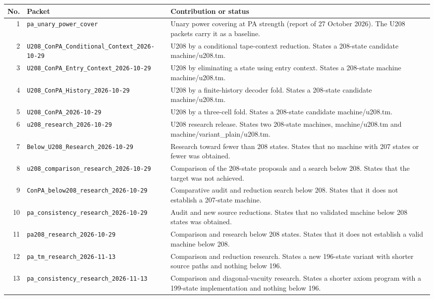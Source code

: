 {\small
\begin{longtable}{rp{}p{}}
\toprule No. & Packet & Contribution or status\\\midrule\endhead
1&\nolinkurl{pa_unary_power_cover}&Unary power covering at PA strength (report of 27 October 2026). The U208 packets carry it as a baseline.\\[3pt]
2&\nolinkurl{U208_ConPA_Conditional_Context_2026-10-29}&U208 by a conditional tape-context reduction. States a 208-state candidate machine/u208.tm.\\[3pt]
3&\nolinkurl{U208_ConPA_Entry_Context_2026-10-29}&U208 by eliminating a state using entry context. States a 208-state machine machine/u208.tm.\\[3pt]
4&\nolinkurl{U208_ConPA_History_2026-10-29}&U208 by a finite-history decoder fold. States a 208-state candidate machine/u208.tm.\\[3pt]
5&\nolinkurl{U208_ConPA_2026-10-29}&U208 by a three-cell fold. States a 208-state candidate machine/u208.tm.\\[3pt]
6&\nolinkurl{u208_research_2026-10-29}&U208 research release. States two 208-state machines, machine/u208.tm and machine/variant\_plain/u208.tm.\\[3pt]
7&\nolinkurl{Below_U208_Research_2026-10-29}&Research toward fewer than 208 states. States that no machine with 207 states or fewer was obtained.\\[3pt]
8&\nolinkurl{u208_comparison_research_2026-10-29}&Comparison of the 208-state proposals and a search below 208. States that the target was not achieved.\\[3pt]
9&\nolinkurl{ConPA_below208_research_2026-10-29}&Comparative audit and reduction search below 208. States that it does not establish a 207-state machine.\\[3pt]
10&\nolinkurl{pa_consistency_research_2026-10-29}&Audit and new source reductions. States that no validated machine below 208 states was obtained.\\[3pt]
11&\nolinkurl{pa208_research_2026-10-29}&Comparison and research below 208 states. States that it does not establish a valid machine below 208.\\[3pt]
12&\nolinkurl{pa_tm_research_2026-11-13}&Comparison and reduction research. States a new 196-state variant with shorter source paths and nothing below 196.\\[3pt]
13&\nolinkurl{pa_consistency_research_2026-11-13}&Comparison and diagonal-vacuity research. States a shorter axiom program with a 199-state implementation and nothing below 196.\\[3pt]

\end{longtable}}
